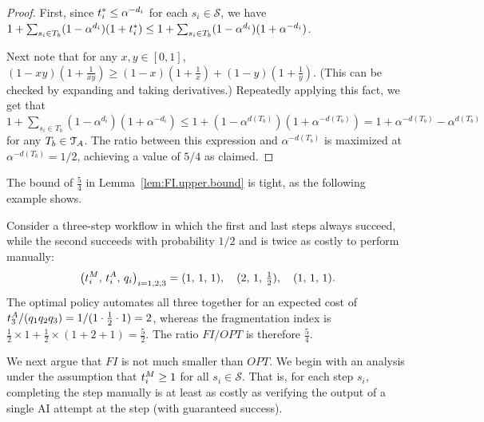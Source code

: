 \begin{proof}
First, since $t^*_{i} \leq \alpha^{-d_i}$ for each $s_i \in \mathcal{S}$, we have $1 + \sum_{s_i \in T_b}(1-\alpha^{d_i})(1+t^*_{i}) \leq 1 + \sum_{s_i \in T_b}(1-\alpha^{d_i})(1+\alpha^{-d_i})$.

Next note that for any $x,y\in [0,1]$, $(1-xy)(1+\tfrac{1}{xy}) \geq (1-x)(1+\tfrac{1}{x}) + (1-y)(1+\tfrac{1}{y})$.
(This can be checked by expanding and taking derivatives.)
Repeatedly applying this fact, we get that $1 + \sum_{s_i \in T_b}(1-\alpha^{d_i})(1+\alpha^{-d_i}) \leq 1 + (1-\alpha^{d(T_b)})(1+\alpha^{-d(T_b)}) = 1 + \alpha^{-d(T_b)} - \alpha^{d(T_b)}$ for any $T_b \in \mathcal{T}_{A}$.
The ratio between this expression and $\alpha^{-d(T_b)}$ is maximized at $\alpha^{-d(T_b)} = 1/2$, achieving a value of $5/4$ as claimed.
\end{proof}

The bound of $\tfrac{5}{4}$ in Lemma~\ref{lem:FI.upper.bound} is tight, as the following example shows.

\begin{example}
\label{ex:FI.tight}
Consider a three-step workflow in which the first and last steps always succeed, while the second succeeds with probability $1/2$ and is twice as costly to perform manually:
\[ \bigl(t^{M}_{i},\, t^{A}_{i},\, q_i\bigr)_{i=1,2,3} = (1,\,1,\,1),\quad (2,\,1,\,\tfrac12),\quad (1,\,1,\,1). \]
The optimal policy automates all three together for an expected cost of $t^{A}_{3}/(q_1 q_2 q_3) = 1/(1 \cdot \tfrac12 \cdot 1) = 2$, whereas the fragmentation index is $\tfrac12 \times 1 + \tfrac12 \times (1+2+1) = \tfrac52$.
The ratio $FI/OPT$ is therefore $\tfrac54$.
\end{example}

We next argue that $FI$ is not much smaller than $OPT$.
We begin with an analysis under the assumption that $t^{M}_{i} \geq 1$ for all $s_i \in \mathcal{S}$.
That is, for each step $s_i$, completing the step manually is at least as costly as verifying the output of a single AI attempt at the step (with guaranteed success).

